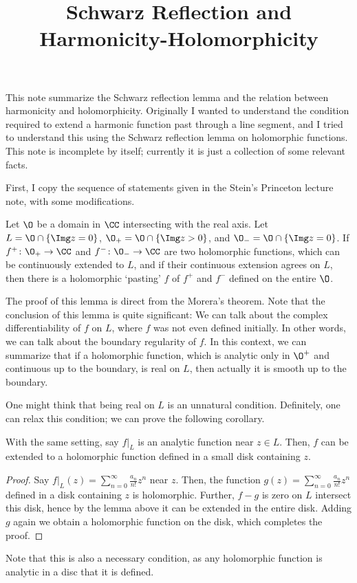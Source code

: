 \documentclass[a4paper]{amsart}
\title{Schwarz Reflection and Harmonicity-Holomorphicity}
\begin{document}
\maketitle

This note summarize the Schwarz reflection lemma and the relation between harmonicity and holomorphicity. 
Originally I wanted to understand the condition required to extend a harmonic function past through a line segment, and I tried to understand this using the Schwarz reflection lemma on holomorphic functions. 
This note is incomplete by itself; currently it is just a collection of some relevant facts. 

First, I copy the sequence of statements given in the Stein's Princeton lecture note, with some modifications.
\begin{lem*}
    Let \(\O\) be a domain in \(\CC\) intersecting with the real axis.
    Let \(L = \O\cap \{\Img z = 0\}\), \(\O_+ = \O\cap \{\Img z > 0\}\), and \(\O_- = \O\cap \{\Img z = 0\}\). 
    If \(f^+\colon \O_+\to \CC\) and \(f^-\colon \O_-\to \CC\) are two holomorphic functions, which can be continuously extended to \(L\), and if their continuous extension agrees on \(L\), then there is a holomorphic `pasting' \(f\) of \(f^+\) and \(f^-\) defined on the entire \(\O\). 
\end{lem*}
The proof of this lemma is direct from the Morera's theorem. 
Note that the conclusion of this lemma is quite significant: We can talk about the complex differentiability of \(f\) on \(L\), where \(f\) was not even defined initially. 
In other words, we can talk about the boundary regularity of \(f\). 
In this context, we can summarize that if a holomorphic function, which is analytic only in \(\O^+\) and continuous up to the boundary, is real on \(L\), then actually it is smooth up to the boundary.

One might think that being real on \(L\) is an unnatural condition. 
Definitely, one can relax this condition; we can prove the following corollary.
\begin{cor*}
    With the same setting, say \(f|_L\) is an analytic function near \(z\in L\).
    Then, \(f\) can be extended to a holomorphic function defined in a small disk containing \(z\). 
\end{cor*}
\begin{proof}
    Say \(f|_L(z) = \sum_{n=0}^{\infty} \frac{a_n}{n!}z^n\) near \(z\).
    Then, the function \(g(z) = \sum_{n=0}^{\infty} \frac{a_n}{n!}z^n\) defined in a disk containing \(z\) is holomorphic.
    Further, \(f - g\) is zero on \(L\) intersect this disk, hence by the lemma above it can be extended in the entire disk. 
    Adding \(g\) again we obtain a holomorphic function on the disk, which completes the proof.
\end{proof}
Note that this is also a necessary condition, as any holomorphic function is analytic in a disc that it is defined.
\end{document}
